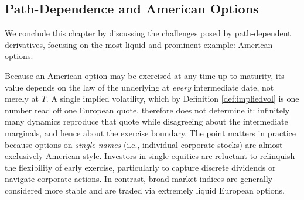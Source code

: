 


\subsection{Path-Dependence and American Options}\label{subsec:american}

We conclude this chapter by  discussing the challenges posed by path-dependent derivatives, focusing on the most liquid and prominent example: American options. 

Because an American option may be exercised at any time up to maturity, its value depends on the law of the underlying at \emph{every} intermediate date, not merely at $T$. A single implied volatility, which by Definition \ref{def:impliedvol} is one number read off one European quote, therefore does not determine it: infinitely many dynamics reproduce that quote while disagreeing about the intermediate marginals, and hence about the exercise boundary. The point matters in practice because options on \textit{single names} (i.e., individual corporate stocks) are almost exclusively American-style. Investors in single equities are reluctant to relinquish the flexibility of early exercise, particularly to capture discrete dividends or navigate corporate actions. In contrast, broad market indices are generally considered more stable and are traded via extremely liquid European options.


